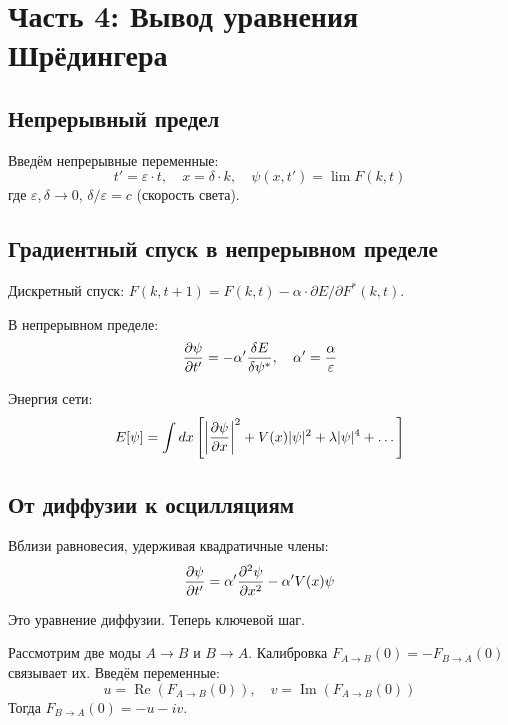 \documentclass[11pt,a4paper]{article}
\theoremstyle{definition}
\begin{document}
\section{Часть 4: Вывод уравнения Шрёдингера}

\subsection{Непрерывный предел}

Введём непрерывные переменные:
\begin{equation}
    t' = \varepsilon \cdot t, \quad x = \delta \cdot k, \quad \psi(x, t') = \lim F(k, t)
\end{equation}
где $\varepsilon, \delta \to 0$, $\delta/\varepsilon = c$ (скорость света).

\subsection{Градиентный спуск в непрерывном пределе}

Дискретный спуск: $F(k, t+1) = F(k, t) - \alpha \cdot \partial E / \partial F^*(k, t)$.

В непрерывном пределе:
\begin{equation}
    \pdv{\psi}{t'} = -\alpha' \frac{\delta E}{\delta \psi^*}, \quad \alpha' = \frac{\alpha}{\varepsilon}
\end{equation}

Энергия сети:
\begin{equation}
    E[\psi] = \int dx \left[ \left| \pdv{\psi}{x} \right|^2 + V(x)|\psi|^2 + \lambda|\psi|^4 + \dots \right]
\end{equation}

\subsection{От диффузии к осцилляциям}

Вблизи равновесия, удерживая квадратичные члены:
\begin{equation}
    \pdv{\psi}{t'} = \alpha' \pdv[2]{\psi}{x} - \alpha' V(x) \psi
\end{equation}

Это уравнение диффузии. Теперь ключевой шаг.

Рассмотрим две моды $A \to B$ и $B \to A$. Калибровка $F_{A \to B}(0) = -F_{B \to A}(0)$ связывает их. Введём переменные:
\begin{equation}
    u = \operatorname{Re}(F_{A \to B}(0)), \quad v = \operatorname{Im}(F_{A \to B}(0))
\end{equation}
Тогда $F_{B \to A}(0) = -u - iv$.
\end{document}
